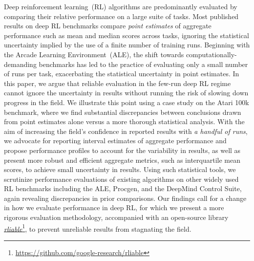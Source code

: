 
Deep reinforcement learning~(RL) algorithms are predominantly evaluated by comparing their relative performance on a large suite of tasks.
Most published results on deep RL benchmarks compare \emph{point estimates} of aggregate performance such as mean and median scores across tasks, ignoring the statistical uncertainty implied by the use of a finite number of training runs.
Beginning with the Arcade Learning Environment~(ALE), the shift towards computationally-demanding benchmarks has led to the practice of evaluating only a small number of runs per task,
exacerbating the statistical uncertainty in point estimates.
In this paper, we argue that reliable evaluation in the few-run deep RL regime cannot ignore the uncertainty in results without running the risk of slowing down progress in the field. 
We illustrate this point using a case study on the Atari 100k benchmark, where we find substantial discrepancies between conclusions drawn from point estimates alone versus a more thorough statistical analysis.
With the aim of increasing the field's confidence in reported results with \emph{a handful of runs}, we advocate for reporting interval estimates of aggregate performance and propose performance profiles to account for the variability in results, as well as present more robust and  efficient aggregate metrics,
such as interquartile mean scores, to achieve small uncertainty in results.
Using such statistical tools, we scrutinize performance evaluations of existing algorithms on other widely used RL benchmarks including the ALE, Procgen, and the DeepMind Control Suite, again revealing discrepancies in prior comparisons. 
Our findings call for a change in how we evaluate performance in deep RL, for which we present a more rigorous evaluation methodology, accompanied with an open-source library \href{https://github.com/google-research/rliable}{\emph{rliable}}\footnote{\url{https://github.com/google-research/rliable}}, to prevent unreliable results from stagnating the field. %


